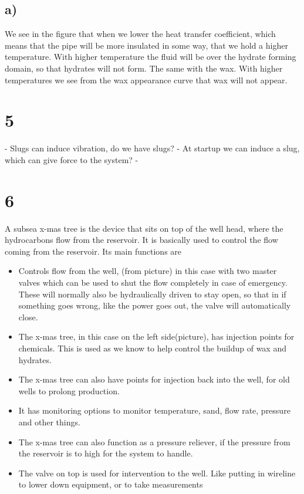 \documentclass[DIV=calc, paper=a4, fontsize=13pt, twocolumn]{scrartcl}	 %
\begin{document}
\subsection*{a)}
We see in the figure that when we lower the heat transfer coefficient, which means that the pipe will be more insulated in some way, that we hold a higher temperature. With higher temperature the fluid will be over the hydrate forming domain, so that hydrates will not form. The same with the wax. With higher temperatures we see from the wax appearance curve that wax will not appear.

\section*{5}
- Slugs can induce vibration, do we have slugs?
- At startup we can induce a slug, which can give force to the system?
- 

\section*{6}
A subsea x-mas tree is the device that sits on top of the well head, where the hydrocarbons flow from the reservoir. It is basically used to control the flow coming from the reservoir. Its main functions are
\begin{itemize}
\item Controls flow from the well, (from picture) in this case with two master valves which can be used to shut the flow completely in case of emergency. These will normally also be hydraulically driven to stay open, so that in if something goes wrong, like the power goes out, the valve will automatically close. 
\item The x-mas tree, in this case on the left side(picture), has injection points for chemicals. This is used as we know to help control the buildup of wax and hydrates.
\item The x-mas tree can also have points for injection back into the well, for old wells to prolong production.
\item It has monitoring options to monitor temperature, sand, flow rate, pressure and other things.
\item The x-mas tree can also function as a pressure reliever, if the pressure from the reservoir is to high for the system to handle.
\item The valve on top is used for intervention to the well. Like putting in wireline to lower down equipment, or to take measurements 
\end{itemize}
\end{document}
